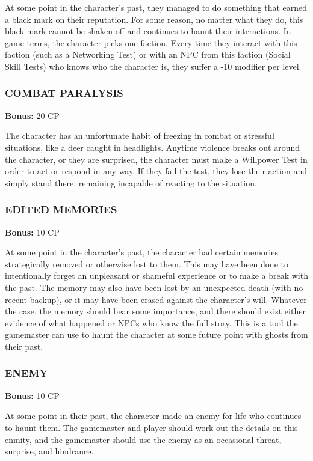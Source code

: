 At some point in the character’s past, they managed to do something that earned
a black mark on their reputation. For some reason, no matter what they do, this
black mark cannot be shaken off and continues to haunt their interactions. In
game terms, the character picks one faction. Every time they interact with this
faction (such as a Networking Test) or with an NPC from this faction (Social
Skill Tests) who knows who the character is, they suffer a -10 modifier per
level.

\subsubsection{COMBAT PARALYSIS}
\textbf{Bonus:} 20 CP

The character has an unfortunate habit of freezing in combat or stressful
situations, like a deer caught in headlights. Anytime violence breaks out
around the character, or they are surprised, the character must make a
Willpower Test in order to act or respond in any way. If they fail the test,
they lose their action and simply stand there, remaining incapable of reacting
to the situation.

\subsubsection{EDITED MEMORIES}
\textbf{Bonus:} 10 CP

At some point in the character’s past, the character had certain memories
strategically removed or otherwise lost to them. This may have been done to
intentionally forget an unpleasant or shameful experience or to make a break
with the past. The memory may also have been lost by an unexpected death (with
no recent backup), or it may have been erased against the character’s
will. Whatever the case, the memory should bear some importance, and there
should exist either evidence of what happened or NPCs who know the full
story. This is a tool the gamemaster can use to haunt the character at some
future point with ghosts from their past.

\subsubsection{ENEMY}
\textbf{Bonus:} 10 CP

At some point in their past, the character made an enemy for life who continues
to haunt them. The gamemaster and player should work out the details on this
enmity, and the gamemaster should use the enemy as an occasional threat,
surprise, and hindrance.

